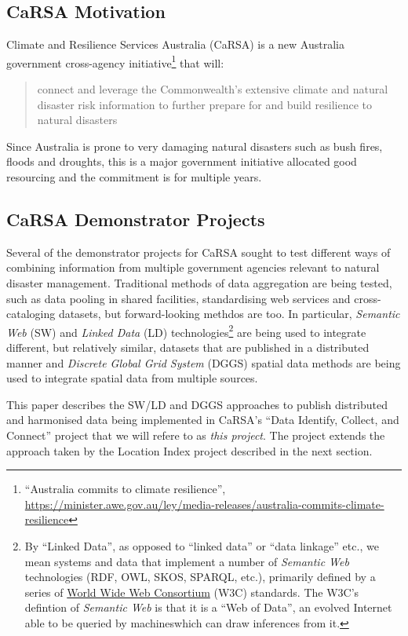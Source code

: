 \documentclass[runningheads]{llncs}
\begin{document}
\subsection{CaRSA Motivation}
Climate and Resilience Services Australia (CaRSA) is a new Australia government cross-agency initiative\footnote{``Australia commits to climate resilience'', \url{https://minister.awe.gov.au/ley/media-releases/australia-commits-climate-resilience}}
that will:

\begin{quote}
    connect and leverage the Commonwealth’s extensive climate and natural disaster risk information to further prepare for and build 
    resilience to natural disasters
\end{quote}

Since Australia is prone to very damaging natural disasters such as bush fires, floods and droughts, this is a major government initiative
allocated good resourcing and the commitment is for multiple years.

\subsection{CaRSA Demonstrator Projects}
Several of the demonstrator projects for CaRSA sought to test different ways of combining information from multiple government agencies 
relevant to natural disaster management. Traditional methods of data aggregation are being tested, such as data pooling in shared facilities,
standardising web services and cross-cataloging datasets, but forward-looking methdos are too. In particular,
\textit{Semantic Web} (SW) and \textit{Linked Data} (LD) technologies\footnote{By ``Linked Data'', as opposed to ``linked data'' or ``data linkage'' etc.,
we mean systems and data that implement a number of \textit{Semantic Web} technologies (RDF, OWL, SKOS, SPARQL, etc.), primarily 
defined by a series of \href{https://www.w3.org/standards/semanticweb/data}{World Wide Web Consortium} (W3C) standards. The W3C's defintion of 
\textit{Semantic Web} is that it is a ``Web of Data'', an evolved Internet able to be queried by machineswhich can draw inferences from it.}
are being used to integrate different, but relatively similar, datasets that are published in a distributed manner and
\textit{Discrete Global Grid System} (DGGS) spatial data methods are being used to integrate spatial data from multiple sources.

This paper describes the SW/LD and DGGS approaches to publish distributed and harmonised data being implemented in CaRSA's ``Data Identify, Collect, and Connect'' project that we will 
refere to as \textit{this project}. The project extends the approach taken by the Location Index project described in the next section.
\end{document}
